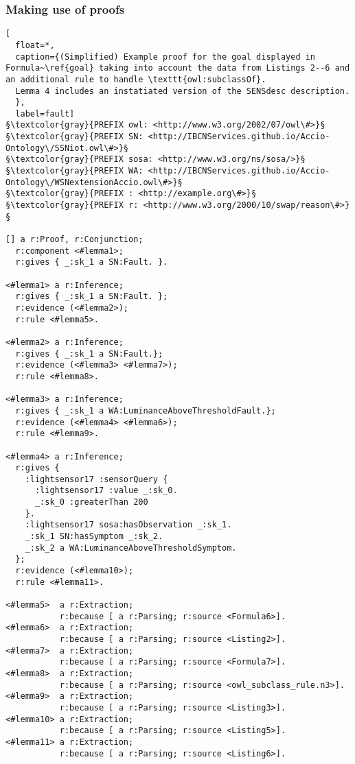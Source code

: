 \subsubsection{Making use of proofs}
\begin{lstlisting}[
  float=*,
  caption={(Simplified) Example proof for the goal displayed in Formula~\ref{goal} taking into account the data from Listings 2--6 and an additional rule to handle \texttt{owl:subclassOf}.
  Lemma 4 includes an instatiated version of the SENSdesc description.
  },
  label=fault]
§\textcolor{gray}{PREFIX owl: <http://www.w3.org/2002/07/owl\#>}§
§\textcolor{gray}{PREFIX SN: <http://IBCNServices.github.io/Accio-Ontology\/SSNiot.owl\#>}§
§\textcolor{gray}{PREFIX sosa: <http://www.w3.org/ns/sosa/>}§
§\textcolor{gray}{PREFIX WA: <http://IBCNServices.github.io/Accio-Ontology\/WSNextensionAccio.owl\#>}§
§\textcolor{gray}{PREFIX : <http://example.org\#>}§
§\textcolor{gray}{PREFIX r: <http://www.w3.org/2000/10/swap/reason\#>}§

[] a r:Proof, r:Conjunction;
  r:component <#lemma1>;
  r:gives { _:sk_1 a SN:Fault. }.

<#lemma1> a r:Inference;
  r:gives { _:sk_1 a SN:Fault. };
  r:evidence (<#lemma2>);
  r:rule <#lemma5>.

<#lemma2> a r:Inference;
  r:gives { _:sk_1 a SN:Fault.};
  r:evidence (<#lemma3> <#lemma7>);
  r:rule <#lemma8>.

<#lemma3> a r:Inference;
  r:gives { _:sk_1 a WA:LuminanceAboveThresholdFault.};
  r:evidence (<#lemma4> <#lemma6>);
  r:rule <#lemma9>.
 
<#lemma4> a r:Inference;
  r:gives {
    :lightsensor17 :sensorQuery {
      :lightsensor17 :value _:sk_0.
      _:sk_0 :greaterThan 200
    }.
    :lightsensor17 sosa:hasObservation _:sk_1.
    _:sk_1 SN:hasSymptom _:sk_2.
    _:sk_2 a WA:LuminanceAboveThresholdSymptom.
  };
  r:evidence (<#lemma10>);
  r:rule <#lemma11>.

<#lemma5>  a r:Extraction; 
           r:because [ a r:Parsing; r:source <Formula6>].
<#lemma6>  a r:Extraction; 
           r:because [ a r:Parsing; r:source <Listing2>].
<#lemma7>  a r:Extraction; 
           r:because [ a r:Parsing; r:source <Formula7>].
<#lemma8>  a r:Extraction; 
           r:because [ a r:Parsing; r:source <owl_subclass_rule.n3>].
<#lemma9>  a r:Extraction; 
           r:because [ a r:Parsing; r:source <Listing3>].
<#lemma10> a r:Extraction; 
           r:because [ a r:Parsing; r:source <Listing5>].
<#lemma11> a r:Extraction; 
           r:because [ a r:Parsing; r:source <Listing6>].
\end{lstlisting}

